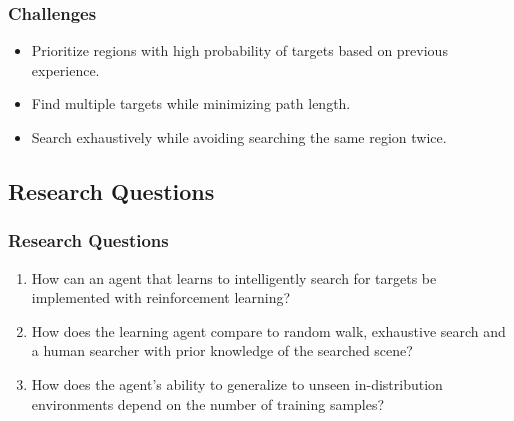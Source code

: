 \begin{frame}
    \frametitle{Challenges}

    \begin{itemize}
        \item Prioritize regions with high probability of targets based on previous experience.
        \item Find multiple targets while minimizing path length.
        \item Search exhaustively while avoiding searching the same region twice.
    \end{itemize}
\end{frame}

\subsection{Research Questions}

\begin{frame}
    \frametitle{Research Questions}
    \begin{enumerate}
        \item How can an agent that learns to intelligently search for targets be implemented with reinforcement learning?
        \item How does the learning agent compare to random walk, exhaustive search and a human searcher with prior knowledge of the searched scene?
        \item How does the agent's ability to generalize to unseen in-distribution environments depend on the number of training samples?
    \end{enumerate}    
\end{frame}